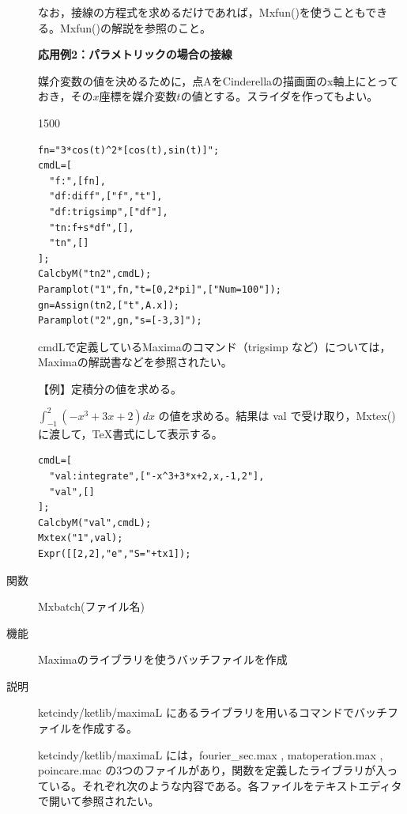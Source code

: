 \documentclass[papersize,a4paper,12pt,uplatex]{jsarticle}
\begin{document}
\begin{description}
\vspace{\baselineskip}
\begin{center}  \end{center}
\vspace{\baselineskip}
なお，接線の方程式を求めるだけであれば，Mxfun()を使うこともできる。Mxfun()の解説を参照のこと。

\vspace{\baselineskip}
{\bf 応用例2：パラメトリックの場合の接線}

\vspace{\baselineskip}
媒介変数の値を決めるために，点AをCinderellaの描画面のx軸上にとっておき，その$x$座標を媒介変数$t$の値とする。スライダを作ってもよい。\\

\begin{layer}{150}{0}
\end{layer}
\begin{verbatim}
fn="3*cos(t)^2*[cos(t),sin(t)]";
cmdL=[
  "f:",[fn],
  "df:diff",["f","t"],
  "df:trigsimp",["df"],
  "tn:f+s*df",[],
  "tn",[]
];
CalcbyM("tn2",cmdL);
Paramplot("1",fn,"t=[0,2*pi]",["Num=100"]);
gn=Assign(tn2,["t",A.x]);
Paramplot("2",gn,"s=[-3,3]");
\end{verbatim}

cmdLで定義しているMaximaのコマンド（trigsimp など）については，Maximaの解説書などを参照されたい。

\vspace{\baselineskip}
【例】定積分の値を求める。

\vspace{\baselineskip}
$\displaystyle \int _{-1} ^2 (-x^3+3x+2)dx$ の値を求める。結果は val で受け取り，Mxtex() に渡して，TeX書式にして表示する。

\begin{verbatim}
cmdL=[
  "val:integrate",["-x^3+3*x+2,x,-1,2"],
  "val",[]
];
CalcbyM("val",cmdL);
Mxtex("1",val);
Expr([[2,2],"e","S="+tx1]);
\end{verbatim}


\vspace{\baselineskip}
\hypertarget{mxbatch}{}
\item[関数]Mxbatch(ファイル名)
\item[機能]Maximaのライブラリを使うバッチファイルを作成
\item[説明]ketcindy/ketlib/maximaL にあるライブラリを用いるコマンドでバッチファイルを作成する。

ketcindy/ketlib/maximaL には，fourier\_sec.max , matoperation.max , poincare.mac の3つのファイルがあり，関数を定義したライブラリが入っている。それぞれ次のような内容である。各ファイルをテキストエディタで開いて参照されたい。


\end{description}
\end{document}
